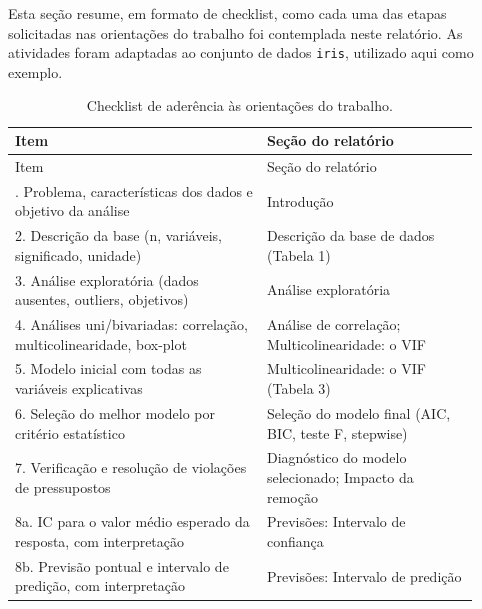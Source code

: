 \documentclass[a4paper]{_extensions/modeloufcg/modeloUFCG}
\begin{document}
Esta seção resume, em formato de checklist, como cada uma das etapas solicitadas nas orientações do trabalho foi contemplada neste relatório. As atividades foram adaptadas ao conjunto de dados \texttt{iris}, utilizado aqui como exemplo.

\begin{longtable}[]{@{}p{0.5\linewidth}p{0.42\linewidth}@{}}
\caption{Checklist de aderência às orientações do trabalho.}\tabularnewline
\toprule\noalign{}
Item & Seção do relatório \\
\midrule\noalign{}
\endfirsthead
\toprule\noalign{}
Item & Seção do relatório \\
\midrule\noalign{}
\endhead
\bottomrule\noalign{}
\endlastfoot
1. Problema, características dos dados e objetivo da análise & Introdução \\
2. Descrição da base (n, variáveis, significado, unidade) & Descrição da base de dados (Tabela 1) \\
3. Análise exploratória (dados ausentes, outliers, objetivos) & Análise exploratória \\
4. Análises uni/bivariadas: correlação, multicolinearidade, box-plot & Análise de correlação; Multicolinearidade: o VIF \\
5. Modelo inicial com todas as variáveis explicativas & Multicolinearidade: o VIF (Tabela 3) \\
6. Seleção do melhor modelo por critério estatístico & Seleção do modelo final (AIC, BIC, teste F, stepwise) \\
7. Verificação e resolução de violações de pressupostos & Diagnóstico do modelo selecionado; Impacto da remoção \\
8a. IC para o valor médio esperado da resposta, com interpretação & Previsões: Intervalo de confiança \\
8b. Previsão pontual e intervalo de predição, com interpretação & Previsões: Intervalo de predição \\
\end{longtable}
\end{document}
